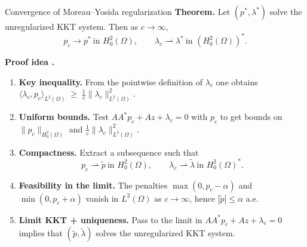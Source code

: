 \documentclass[aspectratio=169]{beamer}
\begin{document}
\begin{frame}{Convergence of Moreau--Yosida regularization}
\small
\textbf{Theorem.}
Let $(p^\ast,\lambda^\ast)$ solve the unregularized KKT system. Then as $c\to\infty$,
\[
p_c \to p^\ast \ \text{in } H_0^2(\Omega),
\qquad
\lambda_c \rightharpoonup \lambda^\ast \ \text{in } (H_0^2(\Omega))^\ast.
\]

\medskip
\textbf{Proof idea .}
\begin{enumerate}
\item \textbf{Key inequality.}
From the pointwise definition of $\lambda_c$ one obtains $
\langle \lambda_c,p_c\rangle_{L^2(\Omega)} \;\ge\; \frac1c\|\lambda_c\|_{L^2(\Omega)}^2.$

\item \textbf{Uniform bounds.}
Test $AA^\ast p_c+Az+\lambda_c=0$ with $p_c$ to get bounds on
$\|p_c\|_{H_0^2(\Omega)}$ and $\frac1c\|\lambda_c\|_{L^2(\Omega)}^2$.

\item \textbf{Compactness.}
Extract a subsequence such that
\[
p_c \rightharpoonup \tilde p \ \text{in }H_0^2(\Omega),
\qquad
\lambda_c \rightharpoonup \tilde\lambda \ \text{in }H_0^2(\Omega)^\ast .
\]

\item \textbf{Feasibility in the limit.}
The penalties
$\max(0,p_c-\alpha)$ and $\min(0,p_c+\alpha)$ vanish in $L^2(\Omega)$ as $c\to\infty$,
hence $|\tilde p|\le \alpha$ a.e.

\item \textbf{Limit KKT + uniqueness.}
Pass to the limit in $AA^\ast p_c+Az+\lambda_c=0$ implies that $(\tilde p,\tilde\lambda)$ solves the unregularized KKT system.
\end{enumerate}
\end{frame}
\end{document}

